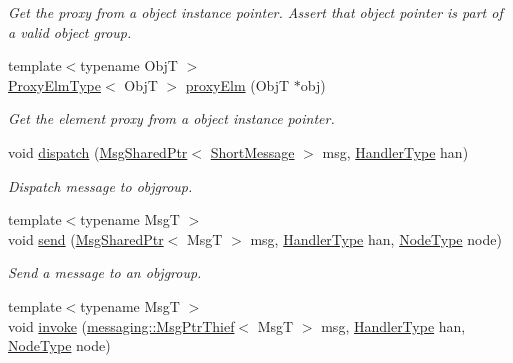 \begin{DoxyCompactItemize}
\begin{DoxyCompactList}\small\item\em Get the proxy from a object instance pointer. Assert that object pointer is part of a valid object group. \end{DoxyCompactList}\item 
{\footnotesize template$<$typename ObjT $>$ }\\\hyperlink{structvt_1_1objgroup_1_1_obj_group_manager_adba6c8ecb0f4c30e719f1abb995cfc9b}{Proxy\+Elm\+Type}$<$ ObjT $>$ \hyperlink{structvt_1_1objgroup_1_1_obj_group_manager_a31f00bd509986001e3154af24239f24d}{proxy\+Elm} (ObjT $\ast$obj)
\begin{DoxyCompactList}\small\item\em Get the element proxy from a object instance pointer. \end{DoxyCompactList}\item 
void \hyperlink{structvt_1_1objgroup_1_1_obj_group_manager_ad3e01d20b90d5447445538541025aa4b}{dispatch} (\hyperlink{namespacevt_ab2b3d506ec8e8d1540aede826d84a239}{Msg\+Shared\+Ptr}$<$ \hyperlink{namespacevt_a1125ac1da6c0bbf141e0ea0739d7602d}{Short\+Message} $>$ msg, \hyperlink{namespacevt_af64846b57dfcaf104da3ef6967917573}{Handler\+Type} han)
\begin{DoxyCompactList}\small\item\em Dispatch message to objgroup. \end{DoxyCompactList}\item 
{\footnotesize template$<$typename MsgT $>$ }\\void \hyperlink{structvt_1_1objgroup_1_1_obj_group_manager_a58abda8b7d1372bea7ca061402e69c75}{send} (\hyperlink{namespacevt_ab2b3d506ec8e8d1540aede826d84a239}{Msg\+Shared\+Ptr}$<$ MsgT $>$ msg, \hyperlink{namespacevt_af64846b57dfcaf104da3ef6967917573}{Handler\+Type} han, \hyperlink{namespacevt_a866da9d0efc19c0a1ce79e9e492f47e2}{Node\+Type} node)
\begin{DoxyCompactList}\small\item\em Send a message to an objgroup. \end{DoxyCompactList}\item 
{\footnotesize template$<$typename MsgT $>$ }\\void \hyperlink{structvt_1_1objgroup_1_1_obj_group_manager_a6b4dbae4a1da797a5d442de2cafc37f1}{invoke} (\hyperlink{structvt_1_1messaging_1_1_msg_ptr_thief}{messaging\+::\+Msg\+Ptr\+Thief}$<$ MsgT $>$ msg, \hyperlink{namespacevt_af64846b57dfcaf104da3ef6967917573}{Handler\+Type} han, \hyperlink{namespacevt_a866da9d0efc19c0a1ce79e9e492f47e2}{Node\+Type} node)

\end{DoxyCompactItemize}
